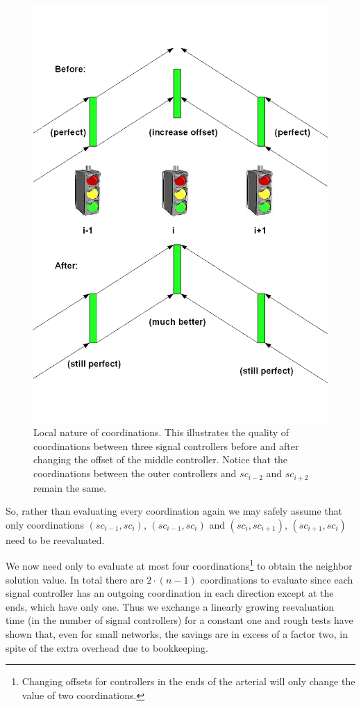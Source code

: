 \begin{figure}[!ht]
\begin{center}
\includegraphics[scale=0.3]{delta_eval.png} 
\end{center}
\caption{Local nature of coordinations. This illustrates the quality of coordinations between three signal controllers before and after changing the offset of the middle controller. Notice that the coordinations between the outer controllers and $sc_{i-2}$ and $sc_{i+2}$ remain the same.}
\label{fig:delta_eval}
\end{figure}

So, rather than evaluating every coordination again we may safely assume that only coordinations $(sc_{i-1},sc_{i})$, $(sc_{i-1},sc_{i})$ and $(sc_{i},sc_{i+1})$, $(sc_{i+1},sc_{i})$ need to be reevaluated. 

We now need only to evaluate at most four coordinations\footnote{Changing offsets for controllers in the ends of the arterial will only change the value of two coordinations.} to obtain the neighbor solution value. In total there are $2\cdot (n-1)$ coordinations to evaluate since each signal controller has an outgoing coordination in each direction except at the ends, which have only one. Thus we exchange a linearly growing reevaluation time (in the number of signal controllers) for a constant one and rough tests have shown that, even for small networks, the savings are in excess of a factor two, in spite of the extra overhead due to bookkeeping.

